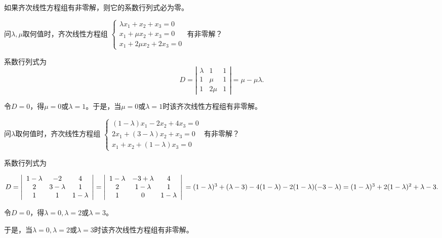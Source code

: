 \begin{tuilun}
    如果齐次线性方程组有非零解，则它的系数行列式必为零。
\end{tuilun}

\begin{example}
    问$\lambda,\mu$取何值时，齐次线性方程组
$\left\{
    \begin{array}{c}
        \lambda x_1+x_2+x_3=0 \\
        x_1+\mu x_2+x_3=0     \\
        x_1+2\mu x_2+2x_3=0
    \end{array}
    \right.$
有非零解？
\end{example}

\begin{solution}
    系数行列式为
$$D=\left|\begin{array}{ccccccc}
        \lambda & 1    & 1 \\
        1       & \mu  & 1 \\
        1       & 2\mu & 1
    \end{array}\right|
    =\mu -\mu \lambda.
$$

令$D=0$，得$\mu =0或 \lambda=1$。于是，当$\mu =0或 \lambda=1$时该齐次线性方程组有非零解。
\end{solution}

\begin{example}
    问$\lambda$取何值时，齐次线性方程组
$\left\{
    \begin{array}{c}
        (1-\lambda) x_1-2x_2+4x_3=0 \\
        2x_1+(3-\lambda) x_2+x_3=0  \\
        x_1+x_2+(1-\lambda)x_3=0
    \end{array}
    \right.$
有非零解？
\end{example}

\begin{solution}
    系数行列式为

$D=\left|\begin{array}{ccccccc}
        1-\lambda & -2        & 4         \\
        2         & 3-\lambda & 1         \\
        1         & 1         & 1-\lambda
    \end{array}\right|
    =\left|\begin{array}{ccccccc}
        1-\lambda & -3+\lambda & 4         \\
        2         & 1-\lambda  & 1         \\
        1         & 0          & 1-\lambda
    \end{array}\right| \\
    =(1-\lambda)^{3}+(\lambda -3)-4(1-\lambda)-2(1-\lambda)(-3-\lambda)
    =(1-\lambda)^{3}+2(1-\lambda)^{2}+\lambda -3
    .
$

令$D=0$，得$\lambda =0,\lambda=2或 \lambda=3$。

于是，当$\lambda =0,\lambda=2或 \lambda=3$时该齐次线性方程组有非零解。
\end{solution}